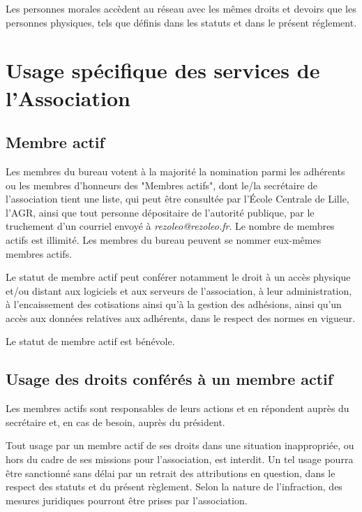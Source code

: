 \documentclass[12pt, a4paper]{article}
\begin{document}
	\bigskip

	Les personnes morales accèdent au réseau avec les mêmes droits et devoirs que
	les personnes physiques, tels que définis dans les statuts et dans le présent réglement.

	\section{Usage spécifique des services de l'Association}

	\subsection{Membre actif}

	Les membres du bureau votent à la majorité la nomination parmi les adhérents
	ou les membres d'honneurs des "Membres actifs", dont le/la secrétaire
	de l'association tient une liste, qui peut être consultée par l'École Centrale
	de Lille, l'AGR, ainsi que tout personne dépositaire de l'autorité publique,
	par le truchement d'un courriel envoyé à \textit{rezoleo@rezoleo.fr}. Le nombre de membres
	actifs est illimité. Les membres du bureau peuvent se nommer eux-mêmes membres
	actifs.

	\bigskip

	Le statut de membre actif peut conférer notamment le droit à un accès physique
	et/ou distant aux logiciels et aux serveurs de l'association, à leur
	administration, à l'encaissement des cotisations ainsi qu'à la gestion des adhésions,
	ainsi qu'un accès aux données relatives aux adhérents, dans le respect des normes
	en vigueur.

	\bigskip

	Le statut de membre actif est bénévole.

	\subsection{Usage des droits conférés à un membre actif}

	Les membres actifs sont responsables de leurs actions et en répondent auprès du
	secrétaire et, en cas de besoin, auprès du président.

	\bigskip

	Tout usage par un membre actif de ses droits dans une situation inappropriée,
	ou hors du cadre de ses missions pour l'association, est interdit. Un tel
	usage pourra être sanctionné sans délai par un retrait des attributions en
	question, dans le respect des statuts et du présent règlement. Selon la nature
	de l'infraction, des mesures juridiques pourront être prises par l'association.
\end{document}
